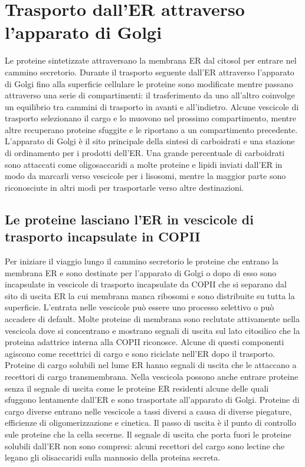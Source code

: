 \section{Trasporto dall'ER attraverso l'apparato di Golgi}
Le proteine sintetizzate attraversano la membrana ER dal citosol per entrare nel cammino secretorio. Durante il trasporto seguente dall'ER attraverso l'apparato di Golgi fino alla
superficie cellulare le proteine sono modificate mentre passano attraverso una serie di compartimenti: il trasferimento da uno all'altro coinvolge un equilibrio tra cammini di
trasporto in avanti e all'indietro. Alcune vescicole di trasporto selezionano il cargo e lo muovono nel prossimo compartimento, mentre altre recuperano proteine sfuggite e le
riportano a un compartimento precedente. L'apparato di Golgi \`e il sito principale della sintesi di carboidrati e una stazione di ordinamento per i prodotti dell'ER. Una grande
percentuale di carboidrati sono attaccati come oligosaccaridi a molte proteine e lipidi inviati dall'ER in modo da marcarli verso vescicole per i lisosomi, mentre la maggior parte
sono riconosciute in altri modi per trasportarle verso altre destinazioni.
\subsection{Le proteine lasciano l'ER in vescicole di trasporto incapsulate in COPII}
Per iniziare il viaggio lungo il cammino secretorio le proteine che entrano la membrana ER e sono destinate per l'apparato di Golgi o dopo di esso sono incapsulate in vescicole di 
trasporto incapsulate da COPII che si separano dal sito di uscita ER la cui membrana manca ribosomi e sono distribuite su tutta la superficie. L'entrata nelle vescicole pu\`o essere
uno processo selettivo o pu\`o accadere di default. Molte proteine di membrana sono reclutate attivamente nella vescicola dove si concentrano e mostrano segnali di uscita sul lato 
citosilico che la proteina adattrice interna alla COPII riconosce. Alcune di questi componenti agiscono come recettrici di cargo e sono riciclate nell'ER dopo il trasporto. Proteine
di cargo solubili nel lume ER hanno segnali di uscita che le attaccano a recettori di cargo transmembrana. Nella vescicola possono anche entrare proteine senza il segnale di uscita come
le proteine ER residenti alcune delle quali sfuggono lentamente dall'ER e sono trasportate all'apparato di Golgi. Proteine di cargo diverse entrano nelle vescicole a tassi diversi
a causa di diverse piegature, efficienze di oligomerizzazione e cinetica. Il passo di uscita \`e il punto di controllo sule proteine che la cella secerne. Il segnale di uscita che 
porta fuori le proteine solubili dall'ER non sono compresi: alcuni recettori del cargo sono lectine che legano gli olisaccaridi sulla mannosio della proteina secreta.
